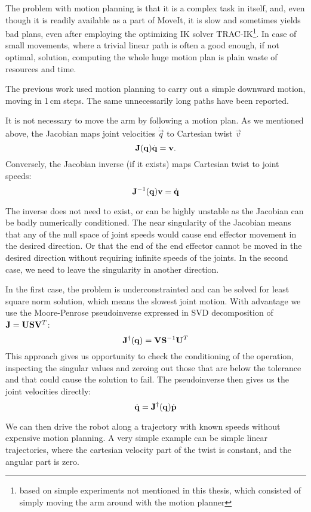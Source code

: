 \documentclass[buriama8_dp.tex]{subfiles}
\begin{document}
The problem with motion planning is that it is a complex task in itself, and, even though it is readily available as a part of MoveIt, it is slow and sometimes yields bad plans, even after employing the optimizing IK solver TRAC-IK\footnote{based on simple experiments not mentioned in this thesis, which consisted of simply moving the arm around with the motion planner}. In case of small movements, where a trivial linear path is often a good enough, if not optimal, solution, computing the whole huge motion plan is plain waste of resources and time.

The previous work \cite{vojta} used motion planning to carry out a simple downward motion, moving in 1\,cm steps. The same unnecessarily long paths have been reported.

It is not necessary to move the arm by following a motion plan. As we mentioned above, the Jacobian maps joint velocities \(\dot{\vec{q}}\) to Cartesian twist \(\vec{v}\)
\[
\mathbf{J}(\mathbf{q}) \dot{\mathbf{q}} = \mathbf{v}.
\]
Conversely, the Jacobian inverse (if it exists) maps Cartesian twist to joint speeds:
\[
\mathbf{J}^{-1}(\mathbf{q}) \mathbf{v} = \dot{\mathbf{q}}
\]

The inverse does not need to exist, or can be highly unstable as the Jacobian can be badly numerically conditioned. The near singularity of the Jacobian means that any of the null space of joint speeds would cause end effector movement in the desired direction. Or that the end of the end effector cannot be moved in the desired direction without requiring infinite speeds of the joints. In the second case, we need to leave the singularity in another direction.

In the first case, the problem is underconstrainted and can be solved for least square norm solution, which means the slowest joint motion. With advantage we use the Moore-Penrose pseudoinverse expressed in SVD decomposition of \(\mathbf{J} = \mathbf{U} \mathbf{S} \mathbf{V}^T \):
\[
\mathbf{J}^\dagger(\mathbf{q}) = \mathbf{V} \mathbf{S}^{-1} \mathbf{U}^T
\]
This approach gives us opportunity to check the conditioning of the operation, inspecting the singular values and zeroing out those that are below the tolerance and that could cause the solution to fail. The pseudoinverse then gives us the joint velocities directly:
\[
 \dot{\mathbf{q}} = \mathbf{J}^\dagger(\mathbf{q}) \dot{\mathbf{p}}
\]

We can then drive the robot along a trajectory with known speeds without expensive motion planning. A very simple example can be simple linear trajectories, where the cartesian velocity part of the twist is constant, and the angular part is zero.
\end{document}

